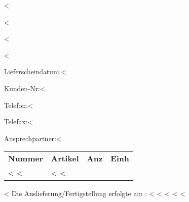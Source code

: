 \documentclass[twoside]{scrartcl}
\begin{document}
\setlength{\parindent}{0cm}

\pagestyle{empty}

\newlength{\descrwidth}\setlength{\descrwidth}{10cm}

\selectfont

\fontsize{10pt}{12pt}\selectfont

\vspace*{1.5cm}

\begin{minipage}{8cm}
  <%

  <%

  <%

  <%
\end{minipage}
\hfill
\begin{minipage}{6cm}
   \vspace*{0.2cm}

  Lieferscheindatum:\hfill <%

  Kunden-Nr:\hfill <%

  Telefon:\hfill <%

  Telefax:\hfill <%

  Ansprechpartner:\hfill <%
\end{minipage}

\vspace*{0.5cm}

\begin{tabular*}{\textwidth}{@{}lp{\descrwidth}@{\extracolsep\fill}rl@{}}
  \textbf{Nummer} & \textbf{Artikel} & \textbf{Anz} & \textbf{Einh}  \\

<%
  <%
    & <%
<%
\end{tabular*}

\vspace{1cm}
<%
        Die Auslieferung/Fertigstellung erfolgte am : <%
<%
<%
  <%
<%
\end{document}

